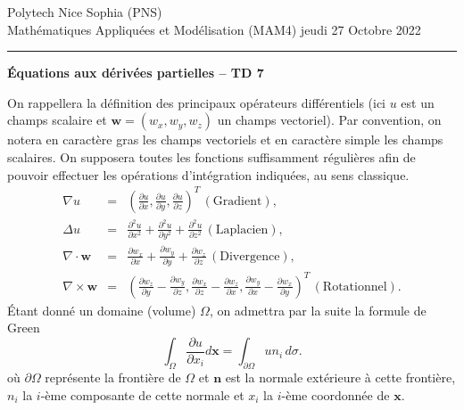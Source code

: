 \documentclass[12pt,a4paper]{article}
\begin{document}
 \hfill Polytech Nice Sophia (PNS)\\
\noindent Math\'ematiques Appliqu\'ees et Mod\'elisation (MAM4) \hfill jeudi 27 Octobre 2022 \\

\hrule

\bigskip
\bigskip

\begin{center}{\bf \'Equations aux d\'eriv\'ees partielles --
TD 7}\end{center}

\bigskip

\noindent On rappellera la d\'efinition des principaux op\'erateurs
diff\'erentiels (ici $u$ est un champs scalaire et $\mathbf{w} =
(w_x,w_y,w_z)$ un champs vectoriel). Par convention, on notera en caract\`ere gras les champs vectoriels et en
caract\`ere simple les champs scalaires. On supposera toutes les fonctions suffisamment r\'eguli\`eres afin de
  pouvoir effectuer les op\'erations d'int\'egration indiqu\'ees, au sens classique.
$$
\begin{array}{lcl}
\nabla u &=& \displaystyle\left(\frac{\partial u}{\partial
    x},\frac{\partial u}{\partial y }, \frac{\partial u}{\partial
    z}\right)^T \, (\mbox{Gradient}), \\[2ex]
\Delta u &=& \displaystyle \frac{\partial^2 u}{\partial
    x^2}+\frac{\partial^2 u}{\partial y^2 }+\frac{\partial^2 u}{\partial
    z^2} \, (\mbox{Laplacien}), \\[2ex]
\nabla\cdot \mathbf{w} &=&  \displaystyle\frac{\partial w_x}{\partial x} +
\frac{\partial w_y}{\partial y} +\frac{\partial w_z}{\partial z}\,  (\mbox{Divergence}),\\[2ex]
 \nabla\times \mathbf{w} &=&  \displaystyle\left(\frac{\partial w_z}{\partial y}
   -\frac{\partial w_y}{\partial z},\frac{\partial w_x}{\partial z}
   -\frac{\partial w_z}{\partial x}, \frac{\partial w_y}{\partial x}
   -\frac{\partial w_x}{\partial y}  \right)^T \, (\mbox{Rotationnel}).
\end{array}
$$
\'Etant donn\'e un domaine (volume) $\Omega$, on admettra par la
suite la formule de Green
$$
\int_{\Omega} \frac{\partial u}{\partial x_i} d\mathbf{x}
= \int_{\partial\Omega}u n_i \, d\sigma.
$$
o\`u $\partial\Omega$ repr\'esente la fronti\`ere de $\Omega$ et
$\mathbf{n}$ est la normale ext\'erieure à cette fronti\`ere, $n_i$
la $i$-\`eme composante de cette normale et $x_i$ la $i$-\`eme
coordonn\'ee de $\mathbf{x}$.\\
\end{document}
